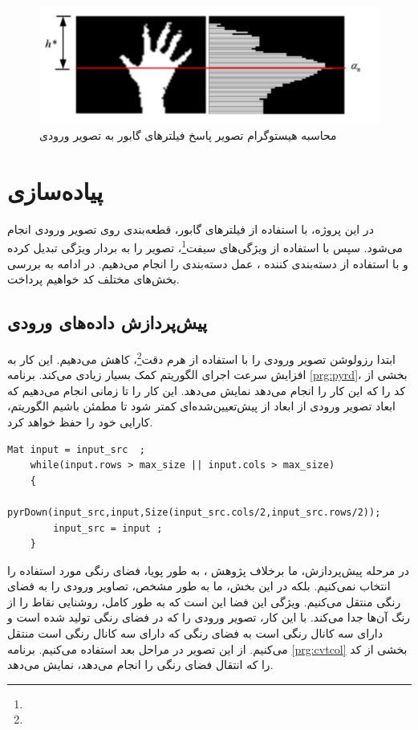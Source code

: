 \documentclass[11.5pt,a4paper]{article}
\newcommand{\enfootnote}[1]{\footnote{\lr{#1}}}
\begin{document}
\begin{figure}[h]
\center
\includegraphics[scale=0.6]{Imgs/hpgf.png}
\caption{محاسبه هیستوگرام تصویر پاسخ فیلترهای گابور به تصویر ورودی \cite{huang2011gabor}}
\label{fig:hpgf}
\end{figure}



\section{ پیاده‌سازی}

در این پروژه، با استفاده از فیلترهای گابور، قطعه‌بندی روی تصویر ورودی انجام می‌شود. سپس با استفاده از ویژگی‌های سیفت\enfootnote{SIFT Features}، تصویر را به بردار ویژگی تبدیل کرده و با استفاده از دسته‌بندی کننده ، عمل دسته‌بندی را انجام می‌دهیم. در ادامه به بررسی بخش‌های مختلف کد خواهیم پرداخت.
\subsection{پیش‌پردازش داده‌های ورودی}
ابتدا رزولوشن تصویر ورودی را با استفاده از هرم دقت\enfootnote{Resolution Pyramid}، کاهش می‌دهیم. این کار به افزایش سرعت اجرای الگوریتم کمک بسیار زیادی می‌کند. برنامه \ref{prg:pyrd}، بخشی از کد را که این کار را انجام می‌دهد نمایش می‌دهد. این کار را تا زمانی انجام می‌دهیم که ابعاد تصویر ورودی از ابعاد از پیش‌تعیین‌شده‌ای کمتر شود تا مطمئن باشیم الگوریتم، کارایی خود را حفظ خواهد کرد.


 \begin{LTR}
    \begin{lstlisting}[style=C++Style,caption=\rl{کاهش رزولوشن تصویر}]
	Mat input = input_src  ;
	while(input.rows > max_size || input.cols > max_size)
	{
		pyrDown(input_src,input,Size(input_src.cols/2,input_src.rows/2));
		input_src = input ;
	}
    \end{lstlisting}
    \label{prg:gyrd}
  \end{LTR}
  

 در مرحله پیش‌پردازش، ما برخلاف پژوهش \cite{huang2011gabor}، به طور پویا، فضای رنگی مورد استفاده را انتخاب نمی‌کنیم. بلکه در این بخش، ما به طور مشخص، تصاویر ورودی را به فضای رنگی  منتقل می‌کنیم. ویژگی این فضا این است که به طور کامل، روشنایی نقاط را از رنگ آن‌ها جدا می‌کند. با این‌ کار، تصویر ورودی را که در فضای رنگی  تولید شده است و دارای سه کانال رنگی است به فضای رنگی  که دارای سه کانال رنگی است منتقل می‌کنیم. از این تصویر در مراحل بعد استفاده می‌کنیم. برنامه \ref{prg:cvtcol} بخشی از کد را که انتقال فضای رنگی را انجام می‌دهد، نمایش می‌دهد.
 
\end{document}
